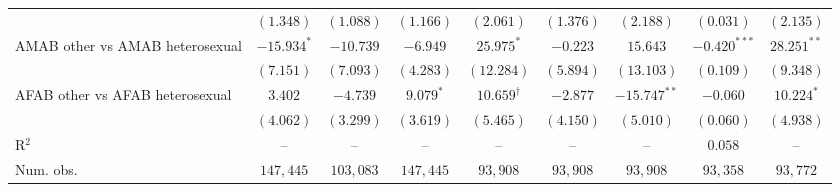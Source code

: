 \begin{table}[htpb!]
{\begin{tabular}{l c c c c c c c c}
 & $(1.348)$ & $(1.088)$ & $(1.166)$ & $(2.061)$ & $(1.376)$ & $(2.188)$ & $(0.031)$ & $(2.135)$ \\
AMAB other vs AMAB heterosexual & $-15.934^{*}$ & $-10.739$ & $-6.949$ & $25.975^{*}$ & $-0.223$ & $15.643$ & $-0.420^{***}$ & $28.251^{**}$ \\
 & $(7.151)$ & $(7.093)$ & $(4.283)$ & $(12.284)$ & $(5.894)$ & $(13.103)$ & $(0.109)$ & $(9.348)$ \\
AFAB other vs AFAB heterosexual & $3.402$ & $-4.739$ & $9.079^{*}$ & $10.659^{\dagger}$ & $-2.877$ & $-15.747^{**}$ & $-0.060$ & $10.224^{*}$ \\
 & $(4.062)$ & $(3.299)$ & $(3.619)$ & $(5.465)$ & $(4.150)$ & $(5.010)$ & $(0.060)$ & $(4.938)$ \\
\hline
R$^2$ & -- & -- & -- & -- & -- & -- & $0.058$ & -- \\
Num. obs. & $147,445$ & $103,083$ & $147,445$ & $93,908$ & $93,908$ & $93,908$ & $93,358$ & $93,772$ \\
\hline
\end{tabular}%
}
\par\vspace{1ex}
\begin{minipage}{\textwidth}\footnotesize\raggedright

\end{minipage}
\end{table}

